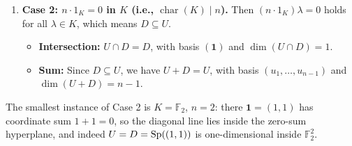 \begin{exercisesolution*}
\begin{enumerate}[label=\textbf{(\alph*)}]
    \item \textbf{Case 2: $n \cdot 1_K = 0$ in $K$ (i.e., $\operatorname{char}(K) \mid n$).}
    Then $(n \cdot 1_K) \lambda = 0$ holds for all $\lambda \in K$, which means $D \subseteq U$.
    \begin{itemize}
        \item \textbf{Intersection:} $U \cap D = D$, with basis $(\mathbf{1})$ and $\dim(U \cap D) = 1$.
        \item \textbf{Sum:} Since $D \subseteq U$, we have $U + D = U$, with basis $(u_1, \dots, u_{n-1})$ and $\dim(U + D) = n - 1$.
    \end{itemize}
\end{enumerate}

The smallest instance of Case 2 is $K = \mathbb{F}_2$, $n = 2$: there $\mathbf{1} = (1,1)$ has coordinate sum $1 + 1 = 0$, so the diagonal line lies inside the zero-sum hyperplane, and indeed $U = D = \operatorname{Sp}((1,1))$ is one-dimensional inside $\mathbb{F}_2^2$.
\end{exercisesolution*}


